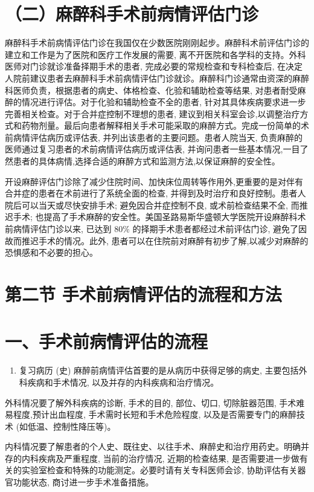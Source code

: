 \documentclass[10pt]{article}
\begin{document}
\section*{（二）麻醉科手术前病情评估门诊}
麻醉科手术前病情评估门诊在我国仅在少数医院刚刚起步。麻醉科术前评估门诊的建立和工作是为了医院和医疗工作发展的需要, 离不开医院和各学科的支持。外科医师对门诊就诊准备择期手术的患者, 完成必要的常规检查和专科检查后, 在决定人院前建议患者去麻醉科手术前病情评估门诊就诊。麻醉科门诊通常由资深的麻醉科医师负责，根据患者的病史、体格检查、化验和辅助检查等结果, 对患者耐受麻醉的情况进行评估。对于化验和辅助检查不全的患者, 针对其具体疾病要求进一步完善相关检查。对于合并症控制不理想的患者, 建议到相关科室会诊,以调整治疗方式和药物剂量。最后向患者解释相关手术可能采取的麻醉方式。完成一份简单的术前病情评估病历或评估表, 并列出该患者的主要问题。患者人院当天, 负责麻醉的医师通过复习患者的术前病情评估病历或评估表, 并询问患者一些基本情况,一目了然患者的具体病情,选择合适的麻醉方式和监测方法,以保证麻醉的安全性。

开设麻醉评估门诊除了减少住院时间、加快床位周转等作用外,更重要的是对伴有合并症的患者在术前进行了系统全面的检查, 并得到及时治疗和良好控制。患者人院后可以当天或尽快安排手术; 避免因合并症控制不良, 或术前检查结果不全, 而推迟手术; 也提高了手术麻醉的安全性。美国圣路易斯华盛顿大学医院开设麻醉科术前病情评估门诊以来, 已达到 $80 \%$ 的择期手术患者都经过术前评估门诊, 避免了因故而推迟手术的情况。此外, 患者可以在住院前对麻醉有初步了解,以减少对麻醉的恐惧感和不必要的担心。

\section*{第二节 手术前病情评估的流程和方法}
\section*{一、手术前病情评估的流程}
\begin{enumerate}
  \item 复习病历 (史) 麻醉前病情评估首要的是从病历中获得足够的病史, 主要包括外科疾病和手术情况, 以及并存的内科疾病和治疗情况。
\end{enumerate}

外科情况要了解外科疾病的诊断, 手术的目的, 部位、切口, 切除脏器范围, 手术难易程度,预计出血程度, 手术需时长短和手术危险程度, 以及是否需要专门的麻醉技术 (如低温、控制性降压等)。

内科情况要了解患者的个人史、既往史、以往手术、麻醉史和治疗用药史。明确并存的内科疾病及严重程度, 当前的治疗情况, 近期的检查结果, 是否需要进一步做有关的实验室检查和特殊的功能测定。必要时请有关专科医师会诊, 协助评估有关器官功能状态, 商讨进一步手术准备措施。
\end{document}
